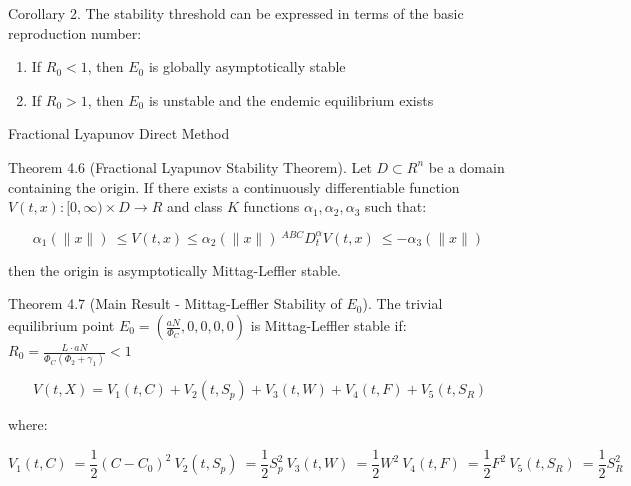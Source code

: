 \documentclass[10pt]{NSP1}
\begin{document}
Corollary 2. The stability threshold can be expressed in terms of the basic reproduction number:

\begin{enumerate}
  \item If \(R_{0} < 1\), then \(E_{0}\) is globally asymptotically stable
  \item If \(R_{0} > 1\), then \(E_{0}\) is unstable and the endemic equilibrium exists
\end{enumerate}

\par\medskip{}\smallskip

Fractional Lyapunov Direct Method

Theorem 4.6 (Fractional Lyapunov Stability Theorem). Let \(D \subset R^{n}\) be a domain containing the origin. If there exists a continuously differentiable function \(V(t,x):\lbrack 0,\infty) \times D \rightarrow R\) and class \(K\) functions \(\alpha_{1},\alpha_{2},\alpha_{3}\) such that:

\[
\alpha_{1}( \parallel x \parallel )\ \leq V(t,x) \leq \alpha_{2}( \parallel x \parallel )\ ^{ABC}D_{t}^{\alpha}V(t,x)\ \leq - \alpha_{3}( \parallel x \parallel )\
\]

then the origin is asymptotically Mittag-Leffler stable.

\par\medskip{}\smallskip

Theorem 4.7 (Main Result - Mittag-Leffler Stability of \(E_{0}\)). The trivial equilibrium point \(E_{0} = \left( \frac{aN}{\Phi_{C}},0,0,0,0 \right)\) is Mittag-Leffler stable if: \(R_{0} = \frac{L \cdot aN}{\Phi_{C}\left( \Phi_{2} + \gamma_{1} \right)} < 1\)

\par\medskip{}\smallskip

\[
V(t,X) = V_{1}(t,C) + V_{2}\left( t,S_{p} \right) + V_{3}(t,W) + V_{4}(t,F) + V_{5}\left( t,S_{R} \right)
\]

where:

\[
V_{1}(t,C)\ = \frac{1}{2}\left( C - C_{0} \right)^{2}\ V_{2}\left( t,S_{p} \right)\ = \frac{1}{2}S_{p}^{2}\ V_{3}(t,W)\ = \frac{1}{2}W^{2}\ V_{4}(t,F)\ = \frac{1}{2}F^{2}\ V_{5}\left( t,S_{R} \right)\ = \frac{1}{2}S_{R}^{2}\
\]
\end{document}
